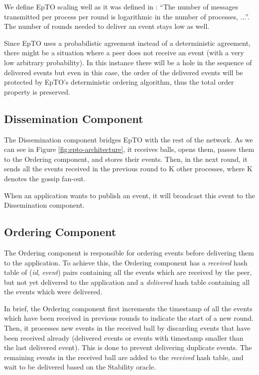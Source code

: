 \documentclass[10pt,conference,a4paper]{IEEEtran}
\begin{document}
We define EpTO scaling well as it was defined in  \autocite{matos2015epto}:  ``The number
of messages transmitted per process per round is logarithmic
in the number of processes, ...''. The number of rounds needed to deliver an event stays low as well.
\par
Since EpTO uses a probabilistic agreement instead of a deterministic agreement, there might be a situation where a peer does not receive an event (with a very low arbitrary probability). In this instance there will be a hole in the sequence of delivered events but even in this case, the order of the delivered events will be protected by EpTO's deterministic ordering algorithm, thus the total order property is preserved.
\subsection{Dissemination Component}
The Dissemination component bridges EpTO with the rest of the network. As we can see in Figure \ref*{fig:epto-architecture}, it receives balls, opens them, passes them to the Ordering component, and stores their events. Then, in the next round, it sends all the events received in the previous round to K other processes, where K denotes the gossip fan-out.

\par
When an application wants to publish an event, it will broadcast this event to the Dissemination component.

\subsection{Ordering Component}
The Ordering component is responsible for ordering events before delivering them to the application.
To achieve this, the Ordering component has a \textit{received} hash table of (\textit{id}, \textit{event}) pairs containing all the events which are received by the peer, but not yet delivered to the application and a \textit{delivered} hash table containing all the events which were delivered.
\par
In brief, the Ordering component first increments the timestamp of all the events which have been received in previous rounds to indicate the start of a new round. Then, it processes new events in the received ball by discarding events that have been received already (delivered events or events with timestamp smaller than the last delivered event). This is done to prevent delivering duplicate events. The remaining events in the received ball are added to the \textit{received} hash table, and wait to be delivered based on the Stability oracle.
\end{document}
